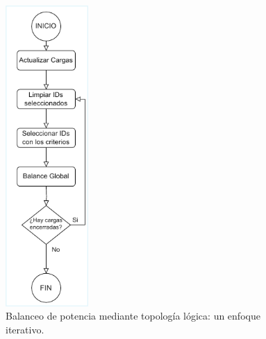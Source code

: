 \begin{figure}[ht!]
    \centering
    \includegraphics[width=0.28\textwidth]{fig/07_bloste/bloste_04.pdf}
    \caption{Balanceo de potencia mediante topología lógica: un enfoque iterativo.}
    \label{fig:iterativeBalance}
\end{figure}


